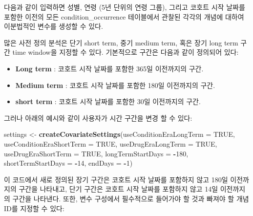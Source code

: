 \documentclass[10.5pt]{book}
\newenvironment{Shaded}{\begin{snugshade}}{\end{snugshade}}
\newcommand{\KeywordTok}[1]{\textcolor[rgb]{0.13,0.29,0.53}{\textbf{#1}}}
\newcommand{\DataTypeTok}[1]{\textcolor[rgb]{0.13,0.29,0.53}{#1}}
\newcommand{\DecValTok}[1]{\textcolor[rgb]{0.00,0.00,0.81}{#1}}
\newcommand{\StringTok}[1]{\textcolor[rgb]{0.31,0.60,0.02}{#1}}
\newcommand{\OtherTok}[1]{\textcolor[rgb]{0.56,0.35,0.01}{#1}}
\newcommand{\OperatorTok}[1]{\textcolor[rgb]{0.81,0.36,0.00}{\textbf{#1}}}
\newcommand{\NormalTok}[1]{#1}
\providecommand{\tightlist}{%
  \setlength{\itemsep}{0pt}\setlength{\parskip}{0pt}}
\theoremstyle{definition}
\theoremstyle{definition}
\theoremstyle{definition}
\theoremstyle{remark}
\begin{document}
다음과 같이 입력하면 성별, 연령 (5년 단위의 연령 그룹), 그리고 코호트
시작 날짜를 포함한 이전의 모든 condition\_occurrence 테이블에서 관찰된
각각의 개념에 대하여 이분법적인 변수를 생성할 수 있다.

많은 사전 정의 분석은 단기 short term, 중기 medium term, 혹은 장기 long
term 구간 time window을 지정할 수 있다. 기본적으로 구간은 다음과 같이
정의되어 있다:

\begin{itemize}
\tightlist
\item
  \textbf{Long term} : 코호트 시작 날짜를 포함한 365일 이전까지의 구간.
\item
  \textbf{Medium term} : 코호트 시작 날짜를 포함한 180일 이전까지의
  구간.
\item
  \textbf{short term} : 코호트 시작 날짜를 포함한 30일 이전까지의 구간.
\end{itemize}

그러나 아래의 예시와 같이 사용자가 시간 구간을 변경 할 수 있다:

\begin{Shaded}
\begin{Highlighting}[]
\NormalTok{settings <-}\StringTok{ }\KeywordTok{createCovariateSettings}\NormalTok{(}\DataTypeTok{useConditionEraLongTerm =} \OtherTok{TRUE}\NormalTok{, }
                                    \DataTypeTok{useConditionEraShortTerm =} \OtherTok{TRUE}\NormalTok{, }
                                    \DataTypeTok{useDrugEraLongTerm =} \OtherTok{TRUE}\NormalTok{,}
                                    \DataTypeTok{useDrugEraShortTerm =} \OtherTok{TRUE}\NormalTok{, }
                                    \DataTypeTok{longTermStartDays =} \OperatorTok{-}\DecValTok{180}\NormalTok{, }
                                    \DataTypeTok{shortTermStartDays =} \OperatorTok{-}\DecValTok{14}\NormalTok{, }
                                    \DataTypeTok{endDays =} \OperatorTok{-}\DecValTok{1}\NormalTok{) }
\end{Highlighting}
\end{Shaded}

이 코드에서 새로 정의된 장기 구간은 코호트 시작 날짜를 포함하지 않고
180일 이전까지의 구간을 나타내고, 단기 구간은 코호트 시작 날짜를
포함하지 않고 14일 이전까지의 구간을 나타낸다. 또한, 변수 구성에서
필수적으로 들어가야 할 것과 빠져야 할 개념 ID를 지정할 수 있다:
\end{document}
